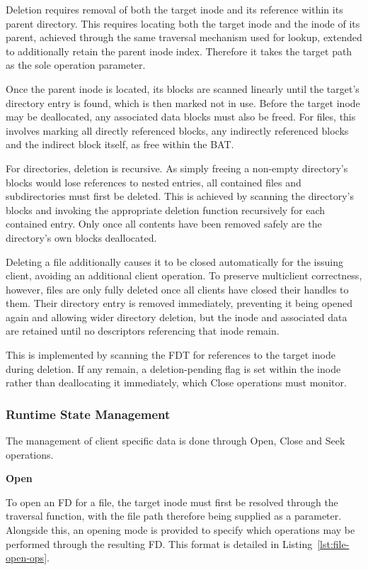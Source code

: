Deletion requires removal of both the target inode and its reference within its parent directory. This requires locating both the target inode and the inode of its parent, achieved through the same traversal mechanism used for lookup, extended to additionally retain the parent inode index. Therefore it takes the target path as the sole operation parameter.

Once the parent inode is located, its blocks are scanned linearly until the target's directory entry is found, which is then marked not in use. Before the target inode may be deallocated, any associated data blocks must also be freed. For files, this involves marking all directly referenced blocks, any indirectly referenced blocks and the indirect block itself, as free within the BAT. 

For directories, deletion is recursive. As simply freeing a non-empty directory’s blocks would lose references to nested entries, all contained files and subdirectories must first be deleted. This is achieved by scanning the directory’s blocks and invoking the appropriate deletion function recursively for each contained entry. Only once all contents have been removed safely are the directory’s own blocks deallocated. 

Deleting a file additionally causes it to be closed automatically for the issuing client, avoiding an additional client operation. To preserve multiclient correctness, however, files are only fully deleted once all clients have closed their handles to them. Their directory entry is removed immediately, preventing it being opened again and allowing wider directory deletion, but the inode and associated data are retained until no descriptors referencing that inode remain. 

This is implemented by scanning the FDT for references to the target inode during deletion. If any remain, a deletion-pending flag is set within the inode rather than deallocating it immediately, which Close operations must monitor.

\subsubsection{Runtime State Management}

The management of client specific data is done through Open, Close and Seek operations.

\textbf{Open}

To open an FD for a file, the target inode must first be resolved through the traversal function, with the file path therefore being supplied as a parameter. Alongside this, an opening mode is provided to specify which operations may be performed through the resulting FD. This format is detailed in Listing~\ref{lst:file-open-ops}.

